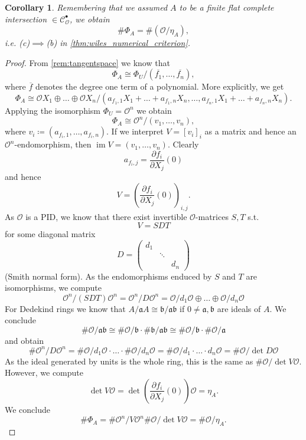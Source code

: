 \documentclass{article}
\theoremstyle{plain}%
\newtheorem{corollary}[theorem]{Corollary}
\theoremstyle{definition}
\theoremstyle{remark}
\newcommand{\cob}{\mathcal{C}_\mathcal{O}^\bullet}
\newcommand{\im}{\operatorname{im}}
\begin{document}
\begin{corollary}\cite[corollary 5.20]{Darmon1995}\label{cor:cimpliesb}
    Remembering that we assumed \(A\) to be a finite flat complete intersection \(\in \cob\), we obtain
    \[
        \# \Phi_A = \# (\mathcal{O}/\eta_A),
    \]
    i.e. (c)\(\implies\)(b) in \cref{thm:wiles_numerical_criterion}.
\end{corollary}
\begin{proof}
    From \cref{rem:tangentspace} we know that 
    \[
        \Phi_A \cong \Phi_U/(\overline{f_1}, \dots, \overline{f_n}),  
    \]
    where \(\overline{f}\) denotes the degree one term of a polynomial. More explicitly, we get
    \[
        \Phi_A \cong \mathcal{O} X_1 \oplus \dots \oplus \mathcal{O} X_n/
        (a_{f_1, 1}X_1 + \dots + a_{f_1, n}X_n, \dots, a_{f_n, 1}X_1 + \dots + a_{f_n, n}X_n).  
    \]
    Applying the isomorphism \(\Phi_U = \mathcal{O}^n\) we obtain
    \[
        \Phi_A \cong \mathcal{O}^n/(v_1, \dots, v_n),
    \]
    where \(v_i \coloneqq (a_{f_i, 1}, \dots, a_{f_i, n})\).
    If we interpret \(V = [v_i]_i\) as a matrix and hence an \(\mathcal{O}^n\)-endomorphism, 
    then \(\im V = (v_1, \dots, v_n)\).
    Clearly
    \[
        a_{f_i, j} = \frac{\partial f_i}{\partial X_j}(0)  
    \]
    and hence 
    \[
        V = (\frac{\partial f_i}{\partial X_j}(0))_{i, j}.
    \]
    As \(\mathcal{O}\) is a PID, we know that there exist invertible \(\mathcal{O}\)-matrices \(S,T\) s.t.
    \[
        V = SDT  
    \]
    for some diagonal matrix 
    \[
        D = \begin{pmatrix}
            d_1&&\\
            &\ddots&\\
            &&d_n
        \end{pmatrix}
    \]
    (Smith normal form).
    As the endomorphisms enduced by \(S\) and \(T\) are isomorphisms, we compute
    \[
        \mathcal{O}^n/(SDT)\mathcal{O}^n = \mathcal{O}^n/D\mathcal{O}^n = 
        \mathcal{O}/d_1\mathcal{O} \oplus \dots \oplus \mathcal{O}/d_n\mathcal{O}
    \]
    For Dedekind rings we know that \(A/\mathfrak{a}A \cong \mathfrak{b}/\mathfrak{a}\mathfrak{b}\)
    if \(0\neq \mathfrak{a},\mathfrak{b}\) are ideals of \(A\).
    We conclude
    \[
        \# \mathcal{O}/\mathfrak{a}\mathfrak{b} 
        \cong \#\mathcal{O}/\mathfrak{b} \cdot \# \mathfrak{b}/\mathfrak{a}\mathfrak{b} 
        \cong \#\mathcal{O}/\mathfrak{b} \cdot \#\mathcal{O}/\mathfrak{a}
    \]
    and obtain
    \[
        \# \mathcal{O}^n/D\mathcal{O}^n 
        = \# \mathcal{O}/d_1\mathcal{O} \cdot \dots \cdot \# \mathcal{O}/d_n\mathcal{O}
        = \# \mathcal{O}/d_1\cdot \dots \cdot d_n\mathcal{O} = \# \mathcal{O}/\det D\mathcal{O}
    \]
    As the ideal generated by units is the whole ring, this is the same as \(\# \mathcal{O}/\det V\mathcal{O}\).
    However, we compute
    \[
        \det V \mathcal{O} = \det (\frac{\partial f_i}{\partial X_j}(0)) \mathcal{O} = \eta_A.
    \]
    We conclude
    \[
        \# \Phi_A = \# \mathcal{O}^n/V\mathcal{O}^n \# \mathcal{O}/\det V\mathcal{O} = \# \mathcal{O}/\eta_A.
    \]
\end{proof}
\end{document}
